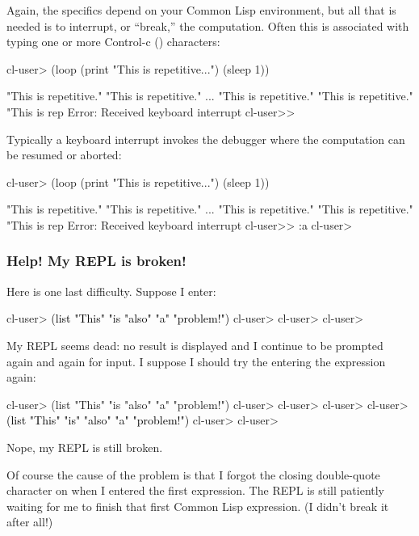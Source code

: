 \documentclass[10pt,twoside,english,pdftex]{article}
\begin{document}
Again, the specifics depend on your Common Lisp environment, but all that is
needed is to interrupt, or ``break,'' the computation.  Often this is
associated with typing one or more Control-c () characters:
%
\W\supp
\begin{example}
\textcolor{darkergray}{%
  cl-user> (loop (print "This is repetitive...") (sleep 1))

  "This is repetitive." 
  "This is repetitive." 
       ...
  "This is repetitive." 
  "This is repetitive." 
  "This is rep\textcolor{black}{}
  Error: Received keyboard interrupt 
  cl-user>>}
\end{example}
%
Typically a keyboard interrupt invokes the debugger where the computation
can be resumed or aborted:
%
\W\supp\notpretop
\begin{example}
\textcolor{darkergray}{%
  cl-user> (loop (print "This is repetitive...") (sleep 1))

  "This is repetitive." 
  "This is repetitive." 
       ...
  "This is repetitive." 
  "This is repetitive." 
  "This is rep
  Error: Received keyboard interrupt 
  cl-user>> \textcolor{black}{:a}
  cl-user>}
\end{example}

\subsubsection*{Help! My REPL is broken!}

Here is one last difficulty.  Suppose I enter:
%
\W\supp
\begin{example}
\textcolor{darkergray}{%
  cl-user> \textcolor{black}{(list "This" "is "also" "a" "problem!")}
  cl-user>
  cl-user>
  cl-user>}
\end{example}
%
My REPL seems dead: no result is displayed and I continue to be prompted again
and again for input.  I suppose I should try the entering the expression
again:
%
\W\supp\notpretop
\begin{example}
\textcolor{darkergray}{%
  cl-user> (list "This" "is "also" "a" "problem!")
  cl-user>
  cl-user>
  cl-user>
  cl-user> \textcolor{black}{(list "This" "is" "also" "a" "problem!")}
  cl-user>
  cl-user>}
\end{example}
%
Nope, my REPL is still broken.

Of course the cause of the problem is that I forgot the closing double-quote
character on  when I entered the first expression.  The REPL is
still patiently waiting for me to finish that first Common Lisp expression.
(I didn't break it after all!)
\end{document}
